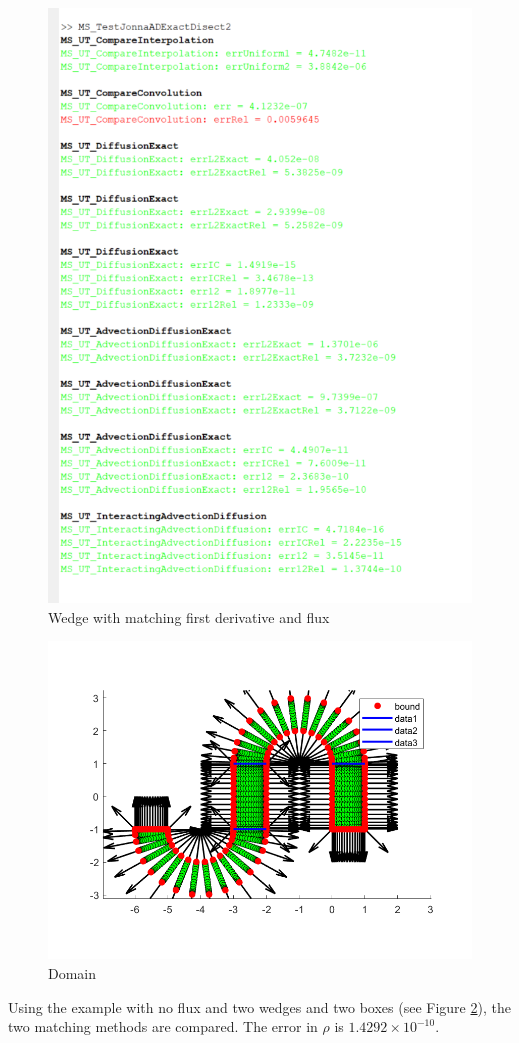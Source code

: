 \documentclass[11pt, a4paper]{article}
\theoremstyle{definition}
\begin{document}
\begin{figure}[h]
		\includegraphics[scale=0.7]{rhoFluxWedge.png}
		\caption{Wedge with matching first derivative and flux} 
		\label{F2}
	\end{figure}
	\begin{figure}[h]
		\centering
		\includegraphics[scale=0.5]{dom1.png}
		\caption{Domain} 
		\label{FD1}
	\end{figure}
	Using the example with no flux and two wedges and two boxes (see Figure \ref{FD1}), the two matching methods are compared. The error in $\rho$ is $1.4292\times 10^{-10}$.
	
\end{document}
